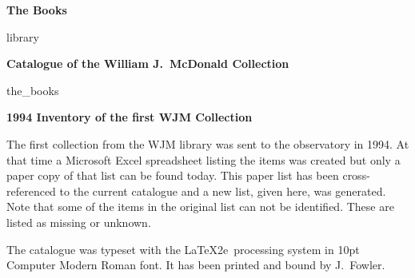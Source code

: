 \documentclass[letterpaper]{book}
\begin{document}
\vspace*{1 in}
\centerline{\Large \bf The Books}
\bigskip\bigskip
{library}
\newpage

\printbibliography

\mainmatter
\begin{center}
  {\Large \bf Catalogue of the William J.\ McDonald Collection}
\end{center}
\bigskip
{the_books}
\cleardoublepage

\begin{center}
  {\Large \bfseries 1994 Inventory of the first WJM Collection}
\end{center}
The first collection from the WJM library was sent to the observatory
in 1994. At that time a Microsoft Excel spreadsheet listing the items
was created but only a paper copy of that list can be found today.
This paper list has been cross-referenced to the current catalogue and
a new list, given here, was generated. Note that some of the items in
the original list can not be identified. These are listed as missing or
unknown.
\bigskip




\backmatter


\begin{colophon}
  The catalogue was typeset with the \LaTeX2e\ processing system in
  10pt Computer Modern Roman font. It has been printed and
  bound by J.~Fowler.
\end{colophon}
\end{document}
